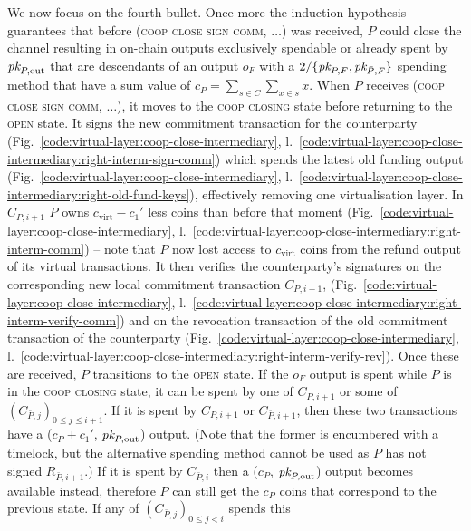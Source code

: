   We now focus on the fourth bullet. Once more the induction hypothesis
  guarantees that before (\textsc{coop close sign comm}, $\dots$) was received,
  $P$ could close the channel resulting in on-chain outputs exclusively
  spendable or already spent by $\textit{pk}_{P, \mathrm{out}}$ that are descendants of
  an output $o_F$ with a $2/\{\textit{pk}_{P, F}, \textit{pk}_{\bar{P}, F}\}$ spending method that
  have a sum value of $c_P = \sum\limits_{s \in C} \sum\limits_{x \in s} x$.
  When $P$ receives (\textsc{coop close sign comm}, $\dots$), it moves to the
  \textsc{coop closing} state before returning to the \textsc{open} state. It
  signs the new commitment transaction for the counterparty
  (Fig.~\ref{code:virtual-layer:coop-close-intermediary},
  l.~\ref{code:virtual-layer:coop-close-intermediary:right-interm-sign-comm})
  which spends the latest old funding output
  (Fig.~\ref{code:virtual-layer:coop-close-intermediary},
  l.~\ref{code:virtual-layer:coop-close-intermediary:right-old-fund-keys}),
  effectively removing one virtualisation layer. In $C_{P, i+1}$ $P$ owns
  $c_{\mathrm{virt}} - c_1'$ less coins than before that moment
  (Fig.~\ref{code:virtual-layer:coop-close-intermediary},
  l.~\ref{code:virtual-layer:coop-close-intermediary:right-interm-comm}) -- note
  that $P$ now lost access to $c_{\mathrm{virt}}$ coins from the refund output
  of its virtual transactions. It then verifies the counterparty's signatures on
  the corresponding new local commitment transaction $C_{P, i+1}$,
  (Fig.~\ref{code:virtual-layer:coop-close-intermediary},
  l.~\ref{code:virtual-layer:coop-close-intermediary:right-interm-verify-comm})
  and on the revocation transaction of the old commitment transaction of the
  counterparty (Fig.~\ref{code:virtual-layer:coop-close-intermediary},
  l.~\ref{code:virtual-layer:coop-close-intermediary:right-interm-verify-rev}).
  Once these are received, $P$ transitions to the \textsc{open} state. If the
  $o_F$ output is spent while $P$ is in the \textsc{coop closing} state, it can
  be spent by one of $C_{P, i+1}$ or some of $(C_{\bar{P}, j})_{0 \leq j \leq
  i+1}$. If it is spent by $C_{P, i+1}$ or $C_{\bar{P}, i+1}$, then these two
  transactions have a ($c_P + c_1'$, $\textit{pk}_{P, \mathrm{out}}$) output. (Note that
  the former is encumbered with a timelock, but the alternative spending method
  cannot be used as $P$ has not signed $R_{\bar{P}, i+1}$.) If it is spent by
  $C_{\bar{P}, i}$ then a ($c_P$, $\textit{pk}_{P, \mathrm{out}}$) output becomes
  available instead, therefore $P$ can still get the $c_P$ coins that correspond
  to the previous state. If any of $(C_{\bar{P}, j})_{0 \leq j < i}$ spends this
